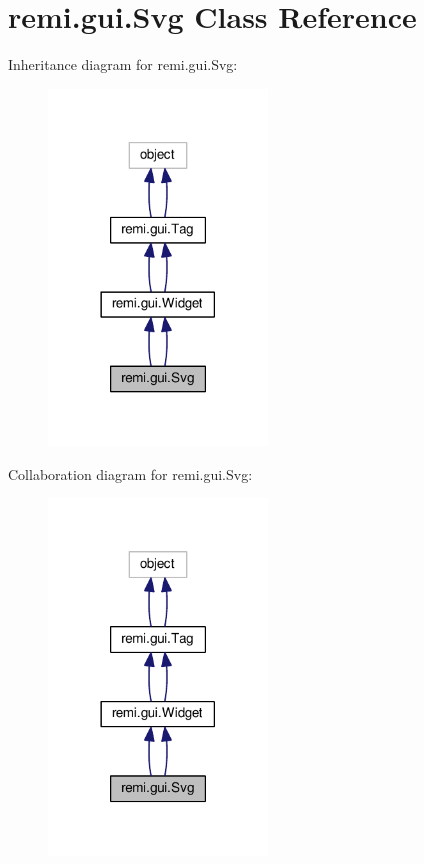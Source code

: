 \hypertarget{classremi_1_1gui_1_1Svg}{}\section{remi.\+gui.\+Svg Class Reference}
\label{classremi_1_1gui_1_1Svg}


Inheritance diagram for remi.\+gui.\+Svg\+:
\nopagebreak
\begin{figure}[H]
\begin{center}
\leavevmode
\includegraphics[width=165pt]{d7/dba/classremi_1_1gui_1_1Svg__inherit__graph}
\end{center}
\end{figure}


Collaboration diagram for remi.\+gui.\+Svg\+:
\nopagebreak
\begin{figure}[H]
\begin{center}
\leavevmode
\includegraphics[width=165pt]{da/dc4/classremi_1_1gui_1_1Svg__coll__graph}
\end{center}
\end{figure}
